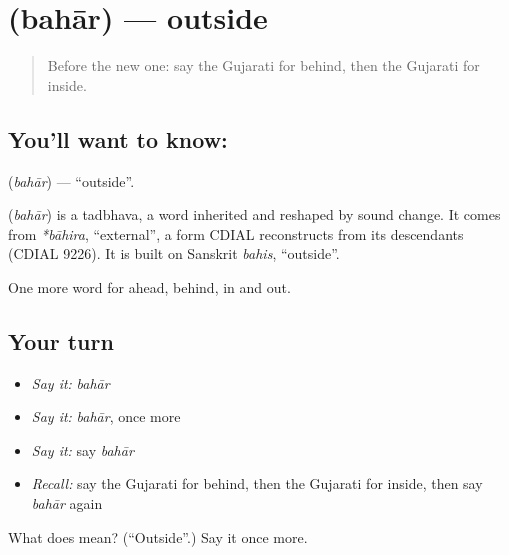 \section[\texorpdfstring{\gu{બહાર} (bahār)}{બહાર (bahār)}]{ (bahār) — outside}

\label{lesson:GU-C75-outside}



\begin{quote}
Before the new one: say the Gujarati for behind, then the Gujarati for inside.
\end{quote}

\subsection*{You'll want to know: }
\textbf{} (\emph{bahār}) — \textquotedblleft{}outside\textquotedblright{}.

\begin{cousinweb}
\textbf{} (\emph{bahār}) is a tadbhava, a word inherited and reshaped by sound change. It comes from \emph{*bāhira}, \textquotedblleft{}external\textquotedblright{}, a form CDIAL reconstructs from its descendants (CDIAL 9226). It is built on Sanskrit \emph{bahis}, \textquotedblleft{}outside\textquotedblright{}.
\end{cousinweb}

\begin{grammarlens}[title={What you've built}]
One more word for ahead, behind, in and out.
\end{grammarlens}

\subsection*{Your turn}
\begin{itemize}
\raggedright
  \item \emph{Say it:} \emph{bahār}
  \item \emph{Say it:} \emph{bahār}, once more
  \item \emph{Say it:} say \emph{bahār}
  \item \emph{Recall:} say the Gujarati for behind, then the Gujarati for inside, then say \emph{bahār} again
\end{itemize}

\begin{tcolorbox}[breakable,colback=teal!4,colframe=teal!35!black,title={Before you move on}]
What does  mean? (\textquotedblleft{}Outside\textquotedblright{}.) Say it once more.
\end{tcolorbox}
